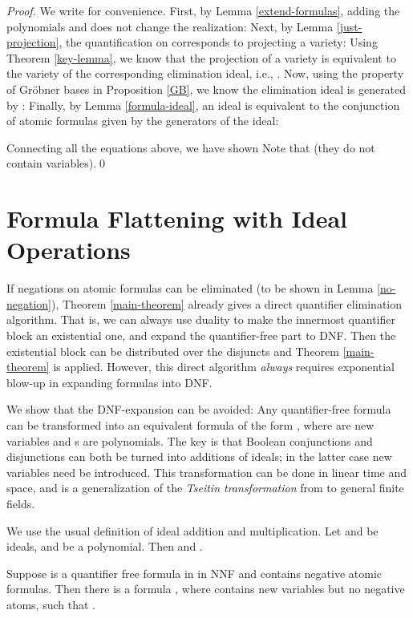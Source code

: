 \documentclass[envcountsect]{llncs}
\begin{document}
\begin{proof}
We write  for convenience. First, by Lemma \ref{extend-formulas}, adding the polynomials  and  does not change the realization:
{}Next, by Lemma \ref{just-projection}, the quantification on  corresponds to projecting a variety:
{}Using Theorem \ref{key-lemma}, we know that the projection of a variety is equivalent to the variety of the corresponding elimination ideal, i.e., . Now, using the property of Gr\"obner bases in Proposition \ref{GB}, we know the elimination ideal  is generated by :
{}Finally, by Lemma \ref{formula-ideal}, an ideal is equivalent to the conjunction of atomic formulas given by the generators of the ideal: 

Connecting all the equations above, we have shown  Note that  (they do not contain  variables).\qed
\end{proof}

\section{Formula Flattening with Ideal Operations}

If negations on atomic formulas can be eliminated (to be shown in Lemma \ref{no-negation}), Theorem \ref{main-theorem} already gives a direct quantifier elimination algorithm. That is, we can always use duality to make the innermost quantifier block an existential one, and expand the quantifier-free part to DNF. Then the existential block can be distributed over the disjuncts and Theorem \ref{main-theorem} is applied. However, this direct algorithm {\em always} requires exponential blow-up in expanding formulas into DNF. 

We show that the DNF-expansion can be avoided: Any quantifier-free formula can be transformed into an equivalent formula of the form , where  are new variables and s are polynomials. The key is that Boolean conjunctions and disjunctions can both be turned into additions of ideals; in the latter case new variables need be introduced. This transformation can be done in linear time and space, and is a generalization of the {\em Tseitin transformation} from  to general finite fields. 

We use the usual definition of ideal addition and multiplication. Let  and  be ideals, and  be a polynomial. Then  and .

\begin{lemma}
Suppose  is a quantifier free formula in  in NNF and contains  negative atomic formulas. Then there is a formula , where  contains new variables  but no negative atoms, such that .
\label{no-negation}\end{lemma}
\end{document}
